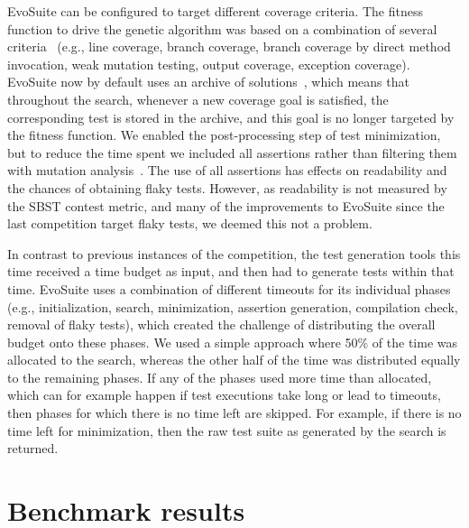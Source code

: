 \documentclass{sig-alternate}
\newcommand{\EVOSUITE}{{\sc EvoSuite}\xspace}
\begin{document}
\EVOSUITE can be configured to target different coverage criteria. The
fitness function to drive the genetic algorithm was based on a
combination of several criteria~\cite{rojas2015combining} (e.g., line
coverage, branch coverage, branch coverage by direct method
invocation, weak mutation testing, output coverage, exception
coverage). \EVOSUITE now by default uses an archive of
solutions~\cite{emse_archive}, which means that throughout the search,
whenever a new coverage goal is satisfied, the corresponding test is
stored in the archive, and this goal is no longer targeted by the
fitness function. We enabled the post-processing step of test
minimization, but to reduce the time spent we included all assertions
rather than filtering them with mutation
analysis~\cite{10.1109/TSE.2011.93}. The use of all assertions has
effects on readability and the chances of obtaining flaky
tests. However, as readability is not measured by the SBST contest
metric, and many of the improvements to \EVOSUITE since the last
competition target flaky tests, we deemed this not a problem.

In contrast to previous instances of the competition, the test
generation tools this time received a time budget as input, and then
had to generate tests within that time. \EVOSUITE uses a combination
of different timeouts for its individual phases (e.g., initialization,
search, minimization, assertion generation, compilation check, removal
of flaky tests), which created the challenge of distributing the
overall budget onto these phases. We used a simple approach where 50\%
of the time was allocated to the search, whereas the other half of the
time was distributed equally to the remaining phases. If any of the
phases used more time than allocated, which can for example happen if
test executions take long or lead to timeouts, then phases for which
there is no time left are skipped. For example, if there is no time
left for minimization, then the raw test suite as generated by the
search is returned.

\section{Benchmark results}

% 
\end{document}

